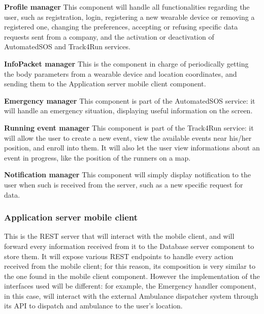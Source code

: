 \documentclass[../main.tex]{subfiles}
\begin{document}
\begin{description}

	\item{\bf Profile manager} This component will handle all functionalities regarding the user, such as registration, login, registering a new wearable device or removing a registered one, changing the preferences, accepting or refusing specific data requests sent from a company, and the activation or deactivation of AutomatedSOS and Track4Run services.

	\item{\bf InfoPacket manager} This is the component in charge of periodically getting the body parameters from a wearable device and location coordinates, and sending them to the Application server mobile client component.

	\item{\bf Emergency manager} This component is part of the AutomatedSOS service: it will handle an emergency situation, displaying useful information on the screen.

	\item{\bf Running event manager} This component is part of the Track4Run service: it will allow the user to create a new event, view the available events near his/her position, and enroll into them. It will also let the user view informations about an event in progress, like the position of the runners on a map.

	\item{\bf Notification manager} This component will simply display notification to the user when such is received from the server, such as a new specific request for data.

\end{description}

\subsubsection{Application server mobile client}  This is the REST server that will interact with the mobile client, and will forward every information received from it to the Database server component to store them. It will expose various REST endpoints to handle every action received from the mobile client; for this reason, its composition is very similar to the one found in the mobile client component. However the implementation of the interfaces used will be different: for example, the Emergency handler component, in this case, will interact with the external Ambulance dispatcher system through its API to dispatch and ambulance to the user's location.
\end{document}
